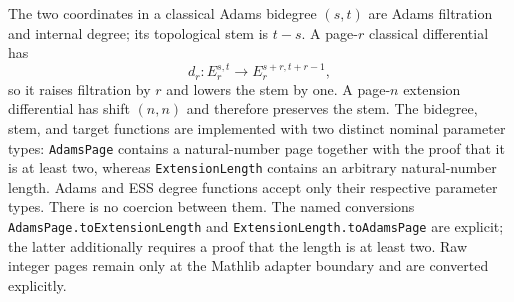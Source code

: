 \begin{definition}
  \label{def:adams-bidegree}
  \leanok
  The two coordinates in a classical Adams bidegree $(s,t)$ are Adams
  filtration and internal degree; its topological stem is $t-s$.  A
  page-$r$ classical differential has
  \[
    d_r:E_r^{s,t}\longrightarrow E_r^{s+r,t+r-1},
  \]
  so it raises filtration by $r$ and lowers the stem by one.  A page-$n$
  extension differential has shift $(n,n)$ and therefore preserves the stem.
  The bidegree, stem, and target functions are implemented with two distinct
  nominal parameter types: \texttt{AdamsPage} contains a natural-number page
  together with the proof that it is at least two, whereas
  \texttt{ExtensionLength} contains an arbitrary natural-number length.
  Adams and ESS degree functions accept only their respective parameter
  types.  There is no coercion between them.  The named conversions
  \texttt{AdamsPage.toExtensionLength} and
  \texttt{ExtensionLength.toAdamsPage} are explicit; the latter additionally
  requires a proof that the length is at least two.  Raw integer pages remain
  only at the Mathlib adapter boundary and are converted explicitly.
\end{definition}

